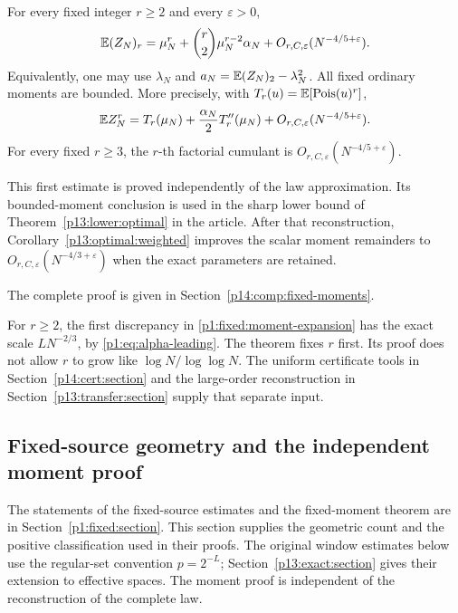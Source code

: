 \begin{theorem}
\label{p1:fixed:moments}
For every fixed integer \(r\ge2\) and every
\(\varepsilon>0\),
\begin{equation}
 \mathbb E(Z_N)_r
   =\mu_N^r+\binom r2\mu_N^{r-2}\alpha_N
       +O_{r,C,\varepsilon}(N^{-4/5+\varepsilon}).
 \label{p1:fixed:moment-expansion}
\end{equation}
Equivalently, one may use \(\lambda_N\) and
\(a_N=\mathbb E(Z_N)_2-\lambda_N^2\).
All fixed ordinary moments are bounded. More precisely,
with \(T_r(u)=\mathbb E[\operatorname{Pois}(u)^r]\),
\begin{equation}
 \mathbb E Z_N^r
    =T_r(\mu_N)+\frac{\alpha_N}{2}T_r''(\mu_N)
       +O_{r,C,\varepsilon}(N^{-4/5+\varepsilon}).
 \label{p1:fixed:ordinary}
\end{equation}
For every fixed \(r\ge3\), the \(r\)-th factorial
cumulant is \(O_{r,C,\varepsilon}(N^{-4/5+\varepsilon})\).
\end{theorem}

This first estimate is proved independently of the law approximation.
Its bounded-moment conclusion is used in the sharp lower bound of
Theorem~\ref{p13:lower:optimal} in the article.
After that reconstruction, Corollary~\ref{p13:optimal:weighted}
improves the scalar moment remainders to
\(O_{r,C,\varepsilon}(N^{-4/3+\varepsilon})\) when the exact
parameters are retained.

\noindent The complete proof is given in Section~\ref{p14:comp:fixed-moments}.


For \(r\ge2\), the first discrepancy in
\eqref{p1:fixed:moment-expansion} has the exact scale
\(L N^{-2/3}\), by \eqref{p1:eq:alpha-leading}.
The theorem fixes \(r\) first. Its proof does not
allow \(r\) to grow like \(\log N/\log\log N\).
The uniform certificate tools in Section~\ref{p14:cert:section} and the
large-order reconstruction in Section~\ref{p13:transfer:section}
supply that separate input.

\subsection{Fixed-source geometry and the independent moment proof}
\label{p14:comp:fixed}

The statements of the fixed-source estimates and the fixed-moment theorem
are in Section~\ref{p1:fixed:section}. This section supplies the geometric
count and the positive classification used in their proofs. The original
window estimates below use the regular-set convention $p=2^{-L}$;
Section~\ref{p13:exact:section} gives their extension to effective spaces.
The moment proof is independent of the reconstruction of the complete law.

